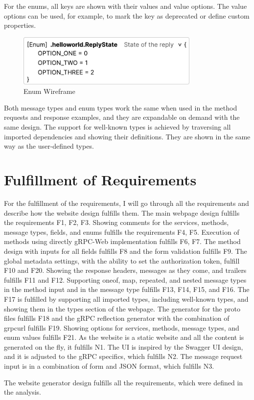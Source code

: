 For the enums, all keys are shown with their values and value options.
The value options can be used, for example, to mark the key as deprecated or define custom properties.

\begin{figure}[hbt!]
    \centering
    \captionsetup{justification=centering}
    \includegraphics[width=0.8\textwidth]{images/design/wireframes/enum}
    \caption{Enum Wireframe}
    \label{fig:wireframe-enum}
\end{figure}

Both message types and enum types work the same when used in the method requests and response examples, and they are expandable on demand with the same design.
The support for well-known types is achieved by traversing all imported dependencies and showing their definitions.
They are shown in the same way as the user-defined types.


\section{Fulfillment of Requirements}
For the fulfillment of the requirements, I will go through all the requirements and describe how the website design fulfills them.
The main webpage design fulfills the requirements F1, F2, F3.
Showing comments for the services, methods, message types, fields, and enums fulfills the requirements F4, F5.
Execution of methods using directly gRPC-Web implementation fulfills F6, F7.
The method design with inputs for all fields fulfills F8 and the form validation fulfills F9.
The global metadata settings, with the ability to set the authorization token, fulfill F10 and F20.
Showing the response headers, messages as they come, and trailers fulfills F11 and F12.
Supporting oneof, map, repeated, and nested message types in the method input and in the message type fulfills F13, F14, F15, and F16.
The F17 is fulfilled by supporting all imported types, including well-known types, and showing them in the types section of the webpage.
The generator for the proto files fulfills F18 and the gRPC reflection generator with the combination of grpcurl fulfills F19.
Showing options for services, methods, message types, and enum values fulfills F21.
As the website is a static website and all the content is generated on the fly, it fulfills N1.
The UI is inspired by the Swagger UI design, and it is adjusted to the gRPC specifics, which fulfills N2.
The message request input is in a combination of form and JSON format, which fulfills N3.

The website generator design fulfills all the requirements, which were defined in the analysis.

